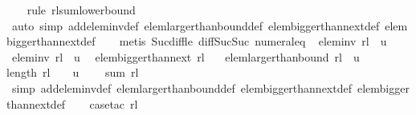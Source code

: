 \begin{isabellebody}
%
\isadelimproof
\ \ %
\endisadelimproof
%
\isatagproof
{}\isamarkupfalse%
\ {\isacharparenleft}rule\ rl{\isacharunderscore}sum{\isacharunderscore}lower{\isacharunderscore}bound{\isacharparenright}\isanewline
\ \ \ \ \ \ \isamarkupfalse%
\ {\isacharparenleft}auto\ simp\ add{\isacharcolon}elem{\isacharunderscore}inv{\isacharunderscore}def\ elem{\isacharunderscore}larger{\isacharunderscore}than{\isacharunderscore}bound{\isacharunderscore}def\ elem{\isacharunderscore}bigger{\isacharunderscore}than{\isacharunderscore}next{\isacharunderscore}{}{\isacharunderscore}def\ elem{\isacharunderscore}bigger{\isacharunderscore}than{\isacharunderscore}next{\isacharunderscore}def{\isacharparenright}\isanewline
\ \ \isamarkupfalse%
\ {\isacharparenleft}metis\ Suc{\isacharunderscore}diff{\isacharunderscore}le\ diff{\isacharunderscore}Suc{\isacharunderscore}Suc\ numeral{\isacharunderscore}{}{\isacharunderscore}eq{\isacharunderscore}{}{\isacharparenright}%
\endisatagproof
{\isafoldproof}%
%
\isadelimproof
\isanewline
%
\endisadelimproof
\isanewline
{}\isamarkupfalse%
\ {\isachardoublequoteopen}\isanewline
elem{\isacharunderscore}inv\ rl\ {}\ u\ {\isasymLongrightarrow}\isanewline
\ elem{\isacharunderscore}inv\ rl\ {}\ u\ {\isasymLongrightarrow}\ \isanewline
elem{\isacharunderscore}bigger{\isacharunderscore}than{\isacharunderscore}next\ rl\ {}\ {\isasymLongrightarrow}\ \isanewline
elem{\isacharunderscore}larger{\isacharunderscore}than{\isacharunderscore}bound\ rl\ {}\ u\ {\isasymLongrightarrow}\isanewline
length\ rl\ {\isacharequal}\ {}\ {\isasymLongrightarrow}\ u\ {\isasymge}\ {}{}\ \isanewline
{\isasymLongrightarrow}\ sum\ rl\ {\isasymge}\ {}{}{}{\isachardoublequoteclose}\isanewline
%
\isadelimproof
\ \ %
\endisadelimproof
%
\isatagproof
{}\isamarkupfalse%
\ {\isacharparenleft}simp\ add{\isacharcolon}elem{\isacharunderscore}inv{\isacharunderscore}def\ elem{\isacharunderscore}larger{\isacharunderscore}than{\isacharunderscore}bound{\isacharunderscore}def\ elem{\isacharunderscore}bigger{\isacharunderscore}than{\isacharunderscore}next{\isacharunderscore}{}{\isacharunderscore}def\ elem{\isacharunderscore}bigger{\isacharunderscore}than{\isacharunderscore}next{\isacharunderscore}def{\isacharparenright}\isanewline
\ \ \isamarkupfalse%
\ {\isacharparenleft}case{\isacharunderscore}tac\ rl{\isacharparenright}\isanewline
\ \ \ \isamarkupfalse%

\end{isabellebody}
